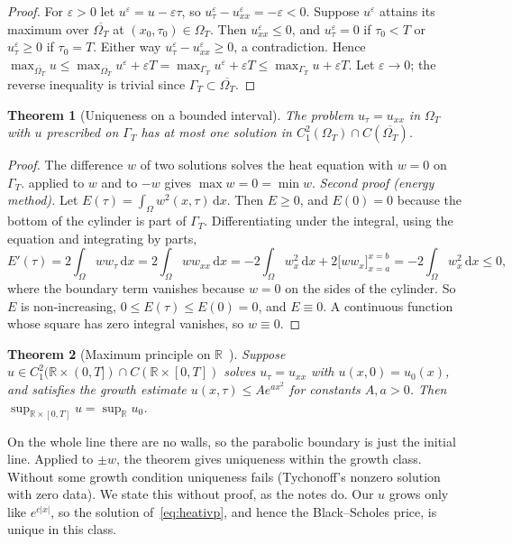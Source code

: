 \documentclass[11pt,a4paper]{article}
\newtheorem{theorem}{Theorem}
\theoremstyle{definition}
\theoremstyle{remark}
\newcommand{\dd}{\,\mathrm{d}}
\begin{document}
\begin{proof}
For $\varepsilon>0$ let $u^\varepsilon=u-\varepsilon\tau$, so $u^\varepsilon_\tau-u^\varepsilon_{xx}=-\varepsilon<0$. Suppose
$u^\varepsilon$ attains its maximum over $\overline{\Omega_T}$ at $(x_0,\tau_0)\in\Omega_T$. Then $u^\varepsilon_{xx}\le0$,
and $u^\varepsilon_\tau=0$ if $\tau_0<T$ or $u^\varepsilon_\tau\ge0$ if $\tau_0=T$. Either way
$u^\varepsilon_\tau-u^\varepsilon_{xx}\ge0$, a contradiction. Hence
$\max_{\overline{\Omega_T}}u\le\max_{\overline{\Omega_T}}u^\varepsilon+\varepsilon T=\max_{\Gamma_T}u^\varepsilon+\varepsilon T\le\max_{\Gamma_T}u+\varepsilon T$.
Let $\varepsilon\to0$; the reverse inequality is trivial since $\Gamma_T\subset\overline{\Omega_T}$.
\end{proof}

\begin{theorem}[Uniqueness on a bounded interval]\label{thm:unique}
The problem $u_\tau=u_{xx}$ in $\Omega_T$ with $u$ prescribed on $\Gamma_T$ has at most one solution in
$C^2_1(\Omega_T)\cap C(\overline{\Omega_T})$.
\end{theorem}

\begin{proof}
The difference $w$ of two solutions solves the heat equation with $w=0$ on $\Gamma_T$. 
applied to $w$ and to $-w$ gives $\max w=0=\min w$.
\emph{Second proof (energy method).} Let $E(\tau)=\int_\Omega w^2(x,\tau)\dd x$. Then $E\ge0$, and $E(0)=0$
because the bottom of the cylinder is part of $\Gamma_T$. Differentiating under the integral, using the equation
and integrating by parts,
\[
  E'(\tau)=2\int_\Omega ww_\tau\dd x=2\int_\Omega ww_{xx}\dd x
  =-2\int_\Omega w_x^2\dd x+2\big[ww_x\big]_{x=a}^{x=b}=-2\int_\Omega w_x^2\dd x\le0 ,
\]
where the boundary term vanishes because $w=0$ on the sides of the cylinder. So $E$ is non-increasing,
$0\le E(\tau)\le E(0)=0$, and $E\equiv0$. A continuous function whose square has zero integral vanishes, so
$w\equiv0$.
\end{proof}

\begin{theorem}[Maximum principle on $\mathbb R$~\cite{classnotes}]\label{thm:maxline}
Suppose $u\in C^2_1(\mathbb R\times(0,T])\cap C(\mathbb R\times[0,T])$ solves $u_\tau=u_{xx}$ with $u(x,0)=u_0(x)$, and
satisfies the growth estimate $u(x,\tau)\le Ae^{ax^2}$ for constants $A,a>0$. Then
$\sup_{\mathbb R\times[0,T]}u=\sup_{\mathbb R}u_0$.
\end{theorem}
On the whole line there are no walls, so the parabolic boundary is just the initial line. Applied to $\pm w$, the
theorem gives uniqueness within the growth class. Without some growth condition uniqueness fails (Tychonoff's
nonzero solution with zero data). We state this without proof, as the notes do. Our $u$ grows only like
$e^{c|x|}$, so the solution of~\eqref{eq:heativp}, and hence the Black--Scholes price, is unique in this class.
\end{document}
